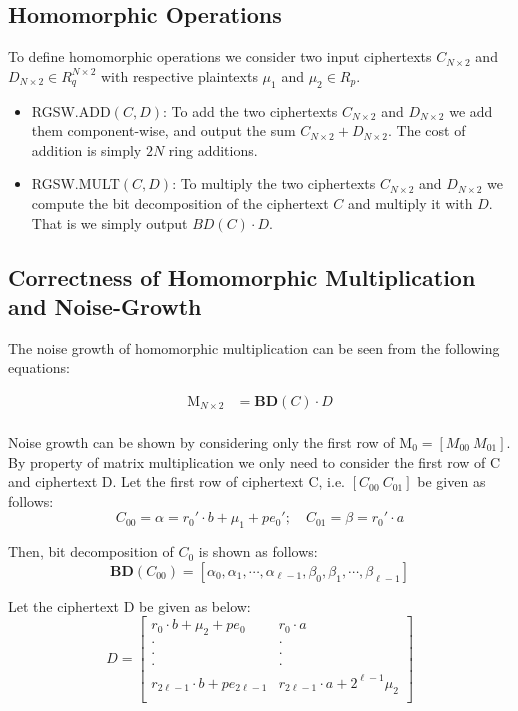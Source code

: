 \documentclass[10pt,journal,compsoc]{IEEEtran}
\theoremstyle{definition}
\begin{document}
\subsection{Homomorphic Operations}

To define homomorphic operations we consider two input ciphertexts $C_{N\times 2}$ and $D_{N\times 2} \in R_q^{N\times 2}$ with respective plaintexts $\mu_1$ and $\mu_2 \in R_p$.

\begin{itemize}
\item RGSW.ADD$\left(C,D\right)$: To add the two ciphertexts $C_{N\times 2}$ and $D_{N\times 2}$ we add them component-wise, and output the sum $C_{N\times 2} + D_{N\times 2}$. The cost of addition is simply $2N$ ring additions.
\item RGSW.MULT$\left(C,D\right)$: To multiply the two ciphertexts $C_{N\times 2}$ and $D_{N\times 2}$ we compute the bit decomposition of the ciphertext $C$ and multiply it with $D$. That is we simply output $BD\left(C\right)\cdot D.$
\end{itemize}

\subsection{Correctness of Homomorphic Multiplication and Noise-Growth}

The noise growth of homomorphic multiplication can be seen from the following equations:

\begin{equation*}
\begin{split}
\textrm{M}_{N\times 2} & = \textbf{BD}\left(C\right)\cdot D\\
\end{split}
\end{equation*}

Noise growth can be shown by considering only the first row of M$_0 = \left[ M_{00} \ M_{01} \right]$. By property of matrix multiplication we only need to consider the first row of C and ciphertext D. Let the first row of ciphertext C, i.e. $\left[ C_{00} \ C_{01} \right]$ be given as follows:
$$ C_{00} = \alpha = r_0'\cdot b + \mu_1 + pe_0'; \quad C_{01} = \beta = r_0'\cdot a$$

Then, bit decomposition of $C_0$ is shown as follows:
$$\textbf{BD}\left(C_{00}\right) = \left[ \alpha_0,\alpha_1,\cdots ,\alpha_{\ell-1},\beta_0,\beta_1,\cdots,\beta_{\ell-1}\right]$$

Let the ciphertext D be given as below:
\[
D =
  \begin{bmatrix}
    r_0\cdot b + \mu_2 + pe_0 & r_0\cdot a \\
    \cdot & \cdot \\
    \cdot & \cdot \\
  	\cdot & \cdot \\      
     r_{2\ell - 1}\cdot b + pe_{2\ell - 1} & r_{2\ell - 1}\cdot a + 2^{\ell - 1}\mu_2\\
  \end{bmatrix}
\]
\end{document}
